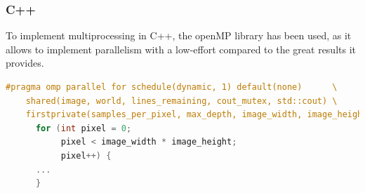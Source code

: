 \subsubsection{C++}
To implement multiprocessing in C++, the \gls{openMP} library has been used, as it allows to implement parallelism with a low-effort compared to the great results it provides. 

\begin{lstlisting}[language=C++, caption={OpenMP Pragma instruction.}, label={lst:openmp_pragma}]
#pragma omp parallel for schedule(dynamic, 1) default(none)      \
    shared(image, world, lines_remaining, cout_mutex, std::cout) \
    firstprivate(samples_per_pixel, max_depth, image_width, image_height)
      for (int pixel = 0;
           pixel < image_width * image_height;
           pixel++) {
      ...
      }    
\end{lstlisting}

